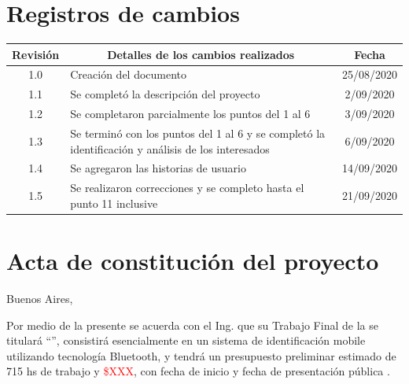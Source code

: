 \documentclass[11pt]{charter}
\begin{document}
\maketitle
\thispagestyle{empty}
\pagebreak


\thispagestyle{empty}
{\setlength{\parskip}{0pt}
\tableofcontents{}
}
\pagebreak


\section{Registros de cambios}
\label{sec:registro}


\begin{table}[ht]
\label{tab:registro}
\centering
\begin{tabularx}{\linewidth}{@{}|c|X|c|@{}}
\hline
\rowcolor[HTML]{C0C0C0} 
Revisión & \multicolumn{1}{c|}{\cellcolor[HTML]{C0C0C0}Detalles de los cambios realizados} & Fecha      \\ \hline
1.0      & Creación del documento                                          & 25/08/2020 \\ \hline
1.1      & Se completó la descripción del proyecto & 2/09/2020 \\ \hline
1.2      & Se completaron parcialmente los puntos del 1 al 6 & 3/09/2020 \\ \hline
1.3		& Se terminó con los puntos del 1 al 6 y se completó la identificación y análisis de los interesados & 6/09/2020 \\ \hline
1.4     & Se agregaron las historias de usuario & 14/09/2020 \\ \hline
1.5		& Se realizaron correcciones y se completo hasta el punto 11 inclusive & 21/09/2020 \\ \hline
\end{tabularx}
\end{table}

\pagebreak



\section{Acta de constitución del proyecto}
\label{sec:acta}

\begin{flushright}
Buenos Aires, \fechaInicioName
\end{flushright}

\vspace{2cm}

Por medio de la presente se acuerda con el Ing. \authorname\hspace{1px} que su Trabajo Final de la \degreename\hspace{1px} se titulará ``\ttitle'', consistirá esencialmente en un sistema de identificación mobile utilizando tecnología Bluetooth, y tendrá un presupuesto preliminar estimado de 715 hs de trabajo y \textcolor{red}{\$XXX}, con fecha de inicio \fechaInicioName\hspace{1px} y fecha de presentación pública \fechaFinalName.
\end{document}
